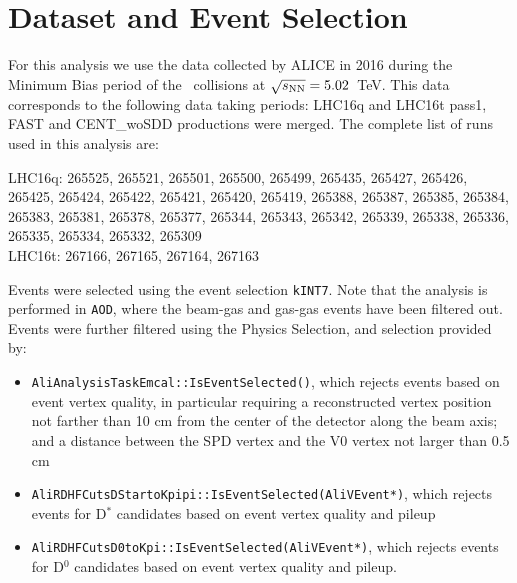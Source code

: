 
\section{Dataset and Event Selection}

For this analysis we use the data collected by ALICE in 2016 during the Minimum Bias period of the \pPb\ collisions at $\sqrt{s_{\rm NN}}=5.02$~TeV. This data corresponds to the following data taking periods:
LHC16q and LHC16t pass1, FAST and CENT\_woSDD productions were merged.
The complete list of runs used in this analysis are:

LHC16q: 265525, 265521, 265501, 265500, 265499, 265435, 265427, 265426, 265425, 265424, 265422, 265421, 265420, 265419, 265388, 265387, 265385, 265384, 265383, 265381, 265378, 265377, 265344, 265343, 265342, 265339, 265338, 265336, 265335, 265334, 265332, 265309  \\
LHC16t: 267166, 267165, 267164, 267163 

Events were selected using the event selection \texttt{kINT7}. Note that the analysis is performed in \texttt{AOD}, where the beam-gas and gas-gas events have been filtered out.
Events were further filtered using the Physics Selection, and selection provided by:
\begin{itemize}
\item \texttt{AliAnalysisTaskEmcal::IsEventSelected()}, which rejects events based on event vertex quality, in particular requiring a reconstructed vertex position not farther than 10 cm from the center of the detector along the beam axis; and a distance between the SPD vertex and the V0 vertex not larger than 0.5 cm %
\item \texttt{AliRDHFCutsDStartoKpipi::IsEventSelected(AliVEvent*)}, which rejects events for D$^*$ candidates based on event vertex quality and pileup
\item \texttt{AliRDHFCutsD0toKpi::IsEventSelected(AliVEvent*)}, which rejects events for D$^0$ candidates based on event vertex quality and pileup.
\end{itemize}


